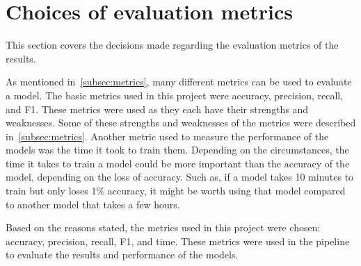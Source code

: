 
\section{Choices of evaluation metrics}\label{sec:choice-of-evaluation}
This section covers the decisions made regarding the evaluation metrics of the results.

As mentioned in~\autoref{subsec:metrics}, many different metrics can be used to evaluate a model. The basic metrics used in this project were accuracy, precision, recall, and F1. These metrics were used as they each have their strengths and weaknesses. Some of these strengths and weaknesses of the metrics were described in~\autoref{subsec:metrics}.
Another metric used to measure the performance of the models was the time it took to train them. Depending on the circumstances, the time it takes to train a model could be more important than the accuracy of the model, depending on the loss of accuracy. Such as, if a model takes 10 minutes to train but only loses 1\% accuracy, it might be worth using that model compared to another model that takes a few hours.

Based on the reasons stated, the metrics used in this project were chosen: accuracy, precision, recall, F1, and time. These metrics were used in the pipeline to evaluate the results and performance of the models.